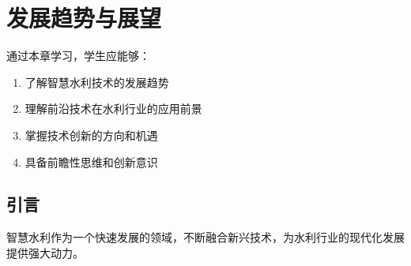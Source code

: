 \chapter{发展趋势与展望}

\begin{learningobjectives}
通过本章学习，学生应能够：
\begin{enumerate}
    \item 了解智慧水利技术的发展趋势
    \item 理解前沿技术在水利行业的应用前景
    \item 掌握技术创新的方向和机遇
    \item 具备前瞻性思维和创新意识
\end{enumerate}
\end{learningobjectives}

\section{引言}

智慧水利作为一个快速发展的领域，不断融合新兴技术，为水利行业的现代化发展提供强大动力。

